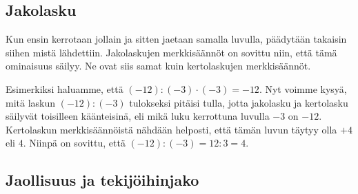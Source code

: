\subsection*{Jakolasku}

Kun ensin kerrotaan jollain ja sitten jaetaan samalla luvulla, päädytään takaisin siihen
mistä lähdettiin.  Jakolaskujen merkkisäännöt on sovittu niin, että tämä ominaisuus säilyy.
Ne ovat siis samat kuin kertolaskujen merkkisäännöt.

Esimerkiksi haluamme, että $(-12):(-3)\cdot (-3)=-12$. Nyt voimme kysyä, mitä laskun
$(-12):(-3)$ tulokseksi pitäisi tulla, jotta jakolasku ja kertolasku säilyvät toisilleen
käänteisinä, eli mikä luku kerrottuna luvulla $-3$ on $-12$. Kertolaskun merkkisäännöistä
nähdään helposti, että tämän luvun täytyy olla $+4$ eli $4$. Niinpä on
sovittu, että $(-12):(-3)=12:3=4$.


\subsection*{Jaollisuus ja tekijöihinjako}

    
\begin{esimerkki}
	\begin{alakohdat}
	\end{alakohdat}
\end{esimerkki}
   

